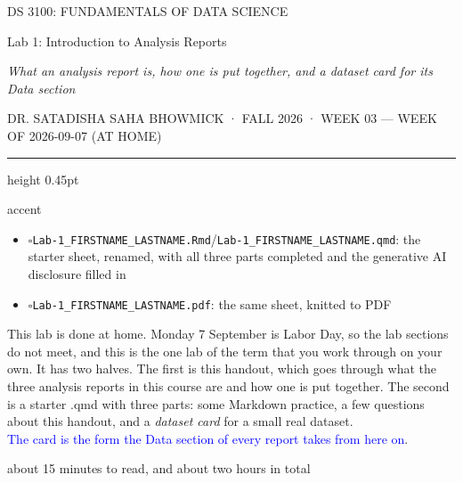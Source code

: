 \documentclass[11pt,letterpaper]{article}
\newcommand{\coursehead}{%
  {\sffamily\fontsize{7.5}{9}\selectfont\MakeUppercase{DS 3100: FUNDAMENTALS OF DATA SCIENCE}}%
}
\newcommand{\checkbox}{\(\square\)}
\newcommand{\code}[1]{\texttt{#1}}
\begin{document}
\thispagestyle{empty}
\coursehead

\vspace{16pt}
{\fontsize{18}{22}\selectfont Lab 1: Introduction to Analysis Reports\par}
\vspace{3pt}
{\itshape\fontsize{11.5}{14}\selectfont
What an analysis report is, how one is put together, and a dataset card for its
Data section\par}
\vspace{13pt}
{\sffamily\fontsize{7.5}{9}\selectfont DR. SATADISHA SAHA BHOWMICK · FALL 2026 · WEEK 03 — WEEK OF 2026-09-07 (AT HOME)\par}

\vspace{18pt}\hrule height 0.45pt
\vspace{38pt}

\begin{callout}[colback=lightblue,colframe=accent,title={\sffamily\fontsize{7.5}{9}\selectfont\color{accent}DELIVERABLES --- DUE SUNDAY 13 SEPTEMBER, 11:59 PM, ON BRIGHTSPACE}]{accent}
\begin{itemize}[leftmargin=16pt,itemsep=5pt,topsep=2pt]
  \item \checkbox\quad \code{Lab-1\_FIRSTNAME\_LASTNAME.Rmd}/\code{Lab-1\_FIRSTNAME\_LASTNAME.qmd}: the starter sheet, renamed, with all three parts completed and the generative AI disclosure filled in
  \item \checkbox\quad \code{Lab-1\_FIRSTNAME\_LASTNAME.pdf}: the same sheet, knitted to PDF
\end{itemize}
\end{callout}

This lab is done at home. Monday 7 September is Labor Day, so the lab sections do not meet, and this is the one lab of the term that you work through on your own. It has two halves. The first is this handout, which goes through what the three analysis reports in this course are and how one is put together. The second is a starter .qmd with three parts: some Markdown practice, a few questions about this handout, and a \emph{dataset card} for a small real dataset.\\ 
\textcolor{blue}{The card is the form the Data section of every report takes from here on}.

\begin{center}
about 15 minutes to read, and about two hours in total
\end{center}
\end{document}
